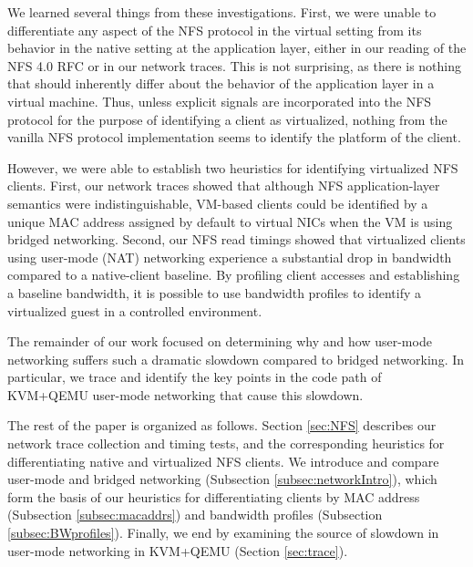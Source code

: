 \documentclass[11pt,pdftex,twocolumn]{article}
\begin{document}
We learned several things from these investigations. First, we were unable to differentiate any aspect of the NFS protocol in the virtual setting from its behavior in the native setting at the application layer, either in our reading of the NFS 4.0 RFC or in our network traces. This is not surprising, as there is nothing that should inherently differ about the behavior of the application layer in a virtual machine. Thus, unless explicit signals are incorporated into the NFS protocol for the purpose of identifying a client as virtualized, nothing from the vanilla NFS protocol implementation seems to identify the platform of the client. 

However, we were able to establish two heuristics for identifying virtualized NFS clients. First, our network traces showed that although NFS application-layer semantics were indistinguishable, VM-based clients could be identified by a unique MAC address assigned by default to virtual NICs when the VM is using bridged networking. Second, our NFS read timings showed that virtualized clients using user-mode (NAT) networking experience a substantial drop in bandwidth compared to a native-client baseline. By profiling client accesses and establishing a baseline bandwidth, it is possible to use bandwidth profiles to identify a virtualized guest in a controlled environment.

The remainder of our work focused on determining why and how user-mode networking suffers such a dramatic slowdown compared to bridged networking. In particular, we trace and identify the key points in the code path of KVM+QEMU user-mode networking that cause this slowdown.

The rest of the paper is organized as follows. Section \ref{sec:NFS} describes our network trace collection and timing tests, and the corresponding heuristics for differentiating native and virtualized NFS clients.  We introduce and compare user-mode and bridged networking (Subsection \ref{subsec:networkIntro}), which form the basis of our heuristics for differentiating clients by MAC address (Subsection \ref{subsec:macaddrs}) and bandwidth profiles (Subsection \ref{subsec:BWprofiles}). Finally, we end by examining the source of slowdown in user-mode networking in KVM+QEMU (Section \ref{sec:trace}).


%
\end{document}
